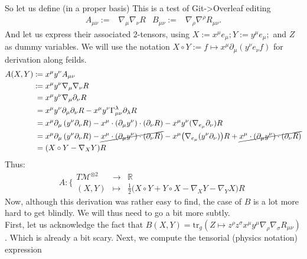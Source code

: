 \documentclass[a4paper,11pt]{article}
\begin{document}
\noindent So let us define (in a proper basis) \color{blue} This is a test of Git->Overleaf editing \color{black}
\begin{align}
    A_{\mu\nu} :=& \nabla_\mu\nabla_\nu R&
    B_{\mu\nu} :=& \nabla_\rho\nabla^\rho R_{\mu\nu}.
\end{align}
And let us express their associated 2-tensors, using $X:=x^\mu e_\mu; Y:=y^\mu e_\mu;$ and $Z$ as dummy variables. We will use the notation $X\circ Y:= f \mapsto x^\mu \partial_\mu (y^\nu e_\nu f)$ for derivation along feilds.
\begin{align*}
    A(X,Y) :\!\!&= x^\mu y^\nu A_{\mu\nu}\\
    :\!\!&= x^\mu y^\nu \nabla_\mu \nabla_\nu R\\
    &= x^\mu y^\nu \nabla_\mu \partial_\nu R\\
    &= x^\mu y^\nu \partial_\mu \partial_\nu R - x^\mu y^\nu \Gamma_{\mu\nu}^\lambda \partial_\lambda R\\
    &= x^\mu \partial_\mu \left(y^\nu \partial_\nu R \right) - x^\mu \cdot(\partial_\mu y^\nu) \cdot (\partial_\nu R) - x^\mu y^\nu (\nabla_{e_\mu} \partial_\nu)R\\
    &= x^\mu \partial_\mu \left(y^\nu \partial_\nu R \right) - \cancel{x^\mu \cdot(\partial_\mu y^\nu) \cdot (\partial_\nu R)} - x^\mu \big(\nabla_{e_\mu} (y^\nu \partial_\nu)\big)R + \cancel{x^\mu \cdot (\partial_\mu y^\nu) \cdot (\partial_\nu R)}\\
    &= (X\circ Y - \nabla_X Y) R
\end{align*}
Thus:
\begin{equation}
    A : \Bigg\{\begin{matrix}
        T\mathcal{M}^{\otimes 2} & \to & \mathbb{R}\\
        (X,Y) & \mapsto & \frac{1}{2}\big(X\circ Y + Y\circ X - \nabla_X Y - \nabla_Y X\big) R
    \end{matrix}
\end{equation}
Now, although this derivation was rather easy to find, the case of $B$ is a lot more hard to get blindly. We will thus need to go a bit more subtly.
\\
First, let us acknowledge the fact that $B(X,Y)=\mathrm{tr}_g(Z\mapsto z^\rho z^\sigma x^\mu y^\mu \nabla_\rho \nabla_\sigma R_{\mu\nu})$. Which is already a bit scary. Next, we compute the tensorial (physics notation) expression
\end{document}
